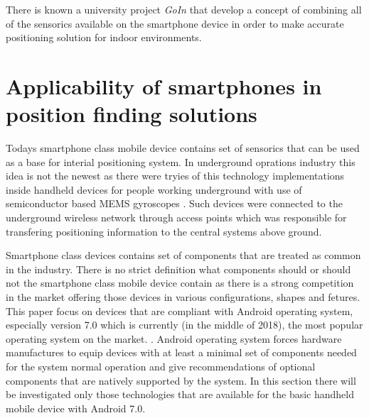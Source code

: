 \documentclass[../main.tex]{subfiles}
\begin{document}
There is known a university project \textit{GoIn} \cite{article_smartphone_features_for_indoor_positioning} that develop a concept of combining all of the sensorics available on the smartphone device in order to make accurate positioning solution for indoor environments.

\section{Applicability of smartphones in position finding solutions} %
\label{sec:mobile_device_dedicated_positioning_systems}

Todays smartphone class mobile device contains set of sensorics that can be used as a base for interial positioning system. In underground oprations industry this idea is not the newest as there were tryies of this technology implementations inside handheld devices for people working underground with use of semiconductor based MEMS gyroscopes \cite{Thesis_CM}. Such devices were connected to the underground wireless network through access points which was responsible for transfering positioning information to the central systems above ground.

Smartphone class devices contains set of components that are treated as common in the industry. There is no strict definition what components should or should not the smartphone class mobile device contain as there is a strong competition in the market offering those devices in various configurations, shapes and fetures. This paper focus on devices that are compliant with Android operating system, especially version 7.0 which is currently (in the middle of 2018), the most popular operating system on the market. \cite{android7.0_cdd}. Android operating system forces hardware manufactures to equip devices with at least a minimal set of components needed for the system normal operation and give recommendations of optional components that are natively supported by the system\cite{android7.0_cdd}. In this section there will be investigated only those technologies that are available for the basic handheld mobile device with Android 7.0.
\end{document}

